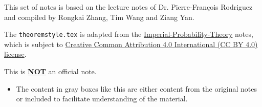 \thispagestyle{empty}
This set of notes is based on the lecture notes of Dr. Pierre-François Rodriguez and compiled by Rongkai Zhang, Tim Wang and Ziang Yan.  

The \verb|theoremstyle.tex| is adapted from the \href{https://github.com/Samuel-CHLam/Imperial-Probability-Theory}{Imperial-Probability-Theory} notes, which is subject to \href{https://github.com/Samuel-CHLam/Imperial-Probability-Theory#license}{Creative Common Attribution 4.0 International (CC BY 4.0) license}.  


This is \underline{\bf NOT} an official note.

\begin{unexaminable}
\begin{itemize}
    \item The content in gray boxes like this are either content from the original notes or included to facilitate understanding of the material.
\end{itemize}
\end{unexaminable}  

